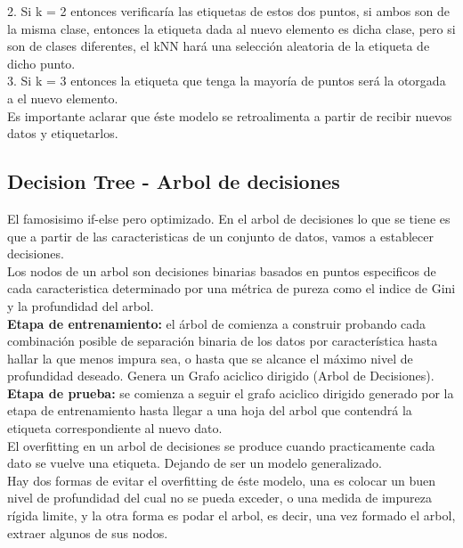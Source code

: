 \documentclass[]{article}
\begin{document}
2. Si k = 2 entonces verificaría las etiquetas de estos dos puntos, si ambos son de la misma clase, entonces la etiqueta dada al nuevo elemento es dicha clase, pero si son de clases diferentes, el kNN hará una selección aleatoria de la etiqueta de dicho punto.\\

3. Si k = 3 entonces la etiqueta que tenga la mayoría de puntos será la otorgada a el nuevo elemento.\\

Es importante aclarar que éste modelo se retroalimenta a partir de recibir nuevos datos y etiquetarlos.

\newpage
\subsection{Decision Tree - Arbol de decisiones}

El famosisimo if-else pero optimizado. En el arbol de decisiones lo que se tiene es que a partir de las caracteristicas de un conjunto de datos, vamos a establecer decisiones.\\

Los nodos de un arbol son decisiones binarias basados en puntos especificos de cada caracteristica determinado por una métrica de pureza como el indice de Gini y la profundidad del arbol.\\

\textbf{Etapa de entrenamiento:} el árbol de comienza a construir probando cada combinación posible de separación binaria de los datos por característica hasta hallar la que menos impura sea, o hasta que se alcance el máximo nivel de profundidad deseado. Genera un Grafo aciclico dirigido (Arbol de Decisiones).\\

\textbf{Etapa de prueba:} se comienza a seguir el grafo aciclico dirigido generado por la etapa de entrenamiento hasta llegar a una hoja del arbol que contendrá la etiqueta correspondiente al nuevo dato.\\

El overfitting en un arbol de decisiones se produce cuando practicamente cada dato se vuelve una etiqueta. Dejando de ser un modelo generalizado.\\

Hay dos formas de evitar el overfitting de éste modelo, una es colocar un buen nivel de profundidad del cual no se pueda exceder, o una medida de impureza rígida limite, y la otra forma es podar el arbol, es decir, una vez formado el arbol, extraer algunos de sus nodos.
\end{document}
